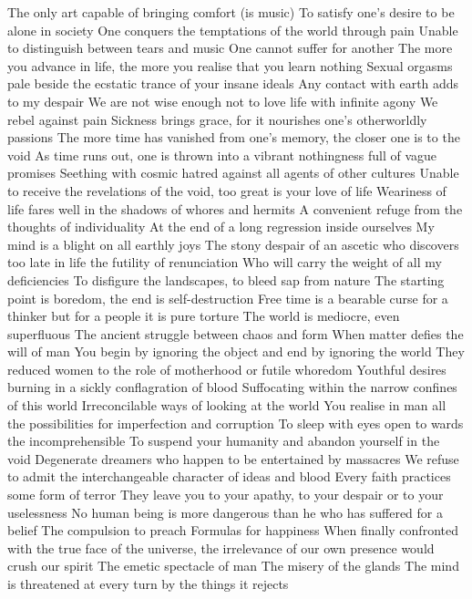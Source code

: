 \documentclass{article}
\begin{document}
\iffalse
The only art capable of bringing comfort (is music)
To satisfy one's desire to be alone in society
One conquers the temptations of the world through pain
Unable to distinguish between tears and music
One cannot suffer for another
The more you advance in life, the more you realise that you learn nothing
Sexual orgasms pale beside the ecstatic trance of your insane ideals
Any contact with earth adds to my despair
We are not wise enough not to love life with infinite agony
We rebel against pain
Sickness brings grace, for it nourishes one's otherworldly passions
The more time has vanished from one's memory, the closer one is to the void
As time runs out, one is thrown into a vibrant nothingness full of vague promises
Seething with cosmic hatred against all agents of other cultures
Unable to receive the revelations of the void, too great is your love of life
Weariness of life fares well in the shadows of whores and hermits
A convenient refuge from the thoughts of individuality
At the end of a long regression inside ourselves
My mind is a blight on all earthly joys
The stony despair of an ascetic who discovers too late in life the futility of renunciation
Who will carry the weight of all my deficiencies
To disfigure the landscapes, to bleed sap from nature
The starting point is boredom, the end is self-destruction
Free time is a bearable curse for a thinker but for a people it is pure torture
The world is mediocre, even superfluous
The ancient struggle between chaos and form
When matter defies the will of man
You begin by ignoring the object and end by ignoring the world
They reduced women to the role of motherhood or futile whoredom
Youthful desires burning in a sickly conflagration of blood
Suffocating within the narrow confines of this world
Irreconcilable ways of looking at the world
You realise in man all the possibilities for imperfection and corruption
To sleep with eyes open to wards the incomprehensible
To suspend your humanity and abandon yourself in the void
Degenerate dreamers who happen to be entertained by massacres
We refuse to admit the interchangeable character of ideas and blood
Every faith practices some form of terror
They leave you to your apathy, to your despair or to your uselessness
No human being is more dangerous than he who has suffered for a belief
The compulsion to preach
Formulas for happiness
When finally confronted with the true face of the universe, the irrelevance of our own presence would crush our spirit
The emetic spectacle of man
The misery of the glands
The mind is threatened at every turn by the things it rejects
\end{document}
